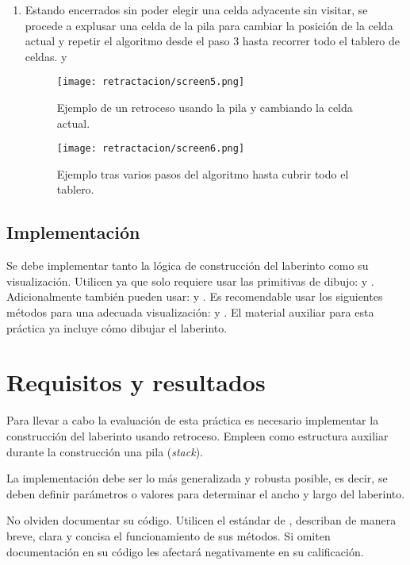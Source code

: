 \begin{enumerate}
  \item Estando encerrados sin poder elegir una celda adyacente sin visitar, se procede a explusar una celda de la pila para cambiar la posición de la celda actual y repetir el algoritmo desde el paso 3 hasta recorrer todo el tablero de celdas. y 
    \begin{figure}[h!]
      \centering
      \texttt{[image: retractacion/screen5.png]}
      \caption{Ejemplo de un retroceso usando la pila y cambiando la celda actual.}
      \label{fig:tablero5}
    \end{figure}
    \pagebreak
    \begin{figure}[h!]
      \centering
      \texttt{[image: retractacion/screen6.png]}
      \caption{Ejemplo tras varios pasos del algoritmo hasta cubrir todo el tablero.}
      \label{fig:tablero6}
    \end{figure}
\end{enumerate}


\subsection{Implementaci\'on}

Se debe implementar tanto la lógica de construcción del laberinto como su visualización. Utilicen  ya que solo requiere usar las primitivas de dibujo:  y . Adicionalmente también pueden usar:  y . Es recomendable usar los siguientes métodos para una adecuada visualización:  y .  El material auxiliar para esta práctica ya incluye cómo dibujar el laberinto.



\section{Requisitos y resultados}

Para llevar a cabo la evaluación de esta práctica es necesario implementar la construcción del laberinto usando retroceso. Empleen como estructura auxiliar durante la construcción una pila (\textit{stack}).

La implementación debe ser lo más generalizada y robusta posible, es decir, se deben definir parámetros o valores para determinar el ancho y largo del laberinto.

No olviden documentar su código. Utilicen el estándar de , describan de manera breve, clara y concisa el funcionamiento de sus métodos. Si omiten documentación en su código les afectará negativamente en su calificación.

